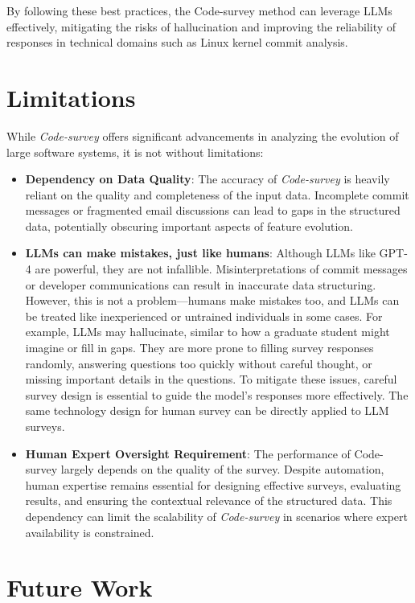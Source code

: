 By following these best practices, the Code-survey method can leverage LLMs effectively, mitigating the risks of hallucination and improving the reliability of responses in technical domains such as Linux kernel commit analysis.


\section{Limitations}

While \emph{Code-survey} offers significant advancements in analyzing the evolution of large software systems, it is not without limitations:

\begin{itemize}
    \item \textbf{Dependency on Data Quality}: The accuracy of \emph{Code-survey} is heavily reliant on the quality and completeness of the input data. Incomplete commit messages or fragmented email discussions can lead to gaps in the structured data, potentially obscuring important aspects of feature evolution.

    \item \textbf{LLMs can make mistakes, just like humans}: Although LLMs like GPT-4 are powerful, they are not infallible. Misinterpretations of commit messages or developer communications can result in inaccurate data structuring. However, this is not a problem—humans make mistakes too, and LLMs can be treated like inexperienced or untrained individuals in some cases. For example, LLMs may hallucinate, similar to how a graduate student might imagine or fill in gaps. They are more prone to filling survey responses randomly, answering questions too quickly without careful thought, or missing important details in the questions. To mitigate these issues, careful survey design is essential to guide the model’s responses more effectively. The same technology design for human survey can be directly applied to LLM surveys.

    \item \textbf{Human Expert Oversight Requirement}: The performance of Code-survey largely depends on the quality of the survey. Despite automation, human expertise remains essential for designing effective surveys, evaluating results, and ensuring the contextual relevance of the structured data. This dependency can limit the scalability of \emph{Code-survey} in scenarios where expert availability is constrained.
\end{itemize}

\section{Future Work}

